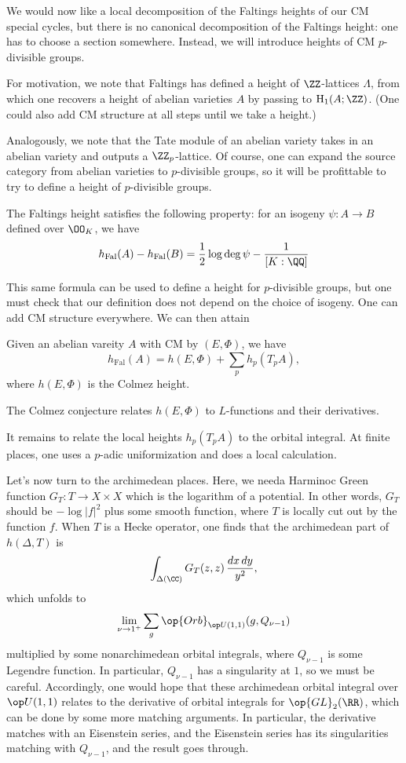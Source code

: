 \documentclass{article}
\begin{document}
We would now like a local decomposition of the Faltings heights of our CM special cycles, but there is no canonical decomposition of the Faltings height: one has to choose a section somewhere. Instead, we will introduce heights of CM $p$-divisible groups.
\begin{remark}
	For motivation, we note that Faltings has defined a height of $\ZZ$-lattices $\Lambda$, from which one recovers a height of abelian varieties $A$ by passing to $\mathrm H_1(A;\ZZ)$. (One could also add CM structure at all steps until we take a height.)
\end{remark}
Analogously, we note that the Tate module of an abelian variety takes in an abelian variety and outputs a $\ZZ_p$-lattice. Of course, one can expand the source category from abelian varieties to $p$-divisible groups, so it will be profittable to try to define a height of $p$-divisible groups.
\begin{remark}
	The Faltings height satisfies the following property: for an isogeny $\psi\colon A\to B$ defined over $\OO_K$, we have
	\[h_{\mathrm{Fal}}(A)-h_{\mathrm{Fal}}(B)=\frac12\log\deg\psi-\frac1{[K:\QQ]}\]
\end{remark}
This same formula can be used to define a height for $p$-divisible groups, but one must check that our definition does not depend on the choice of isogeny. One can add CM structure everywhere. We can then attain
\begin{proposition}
	Given an abelian vareity $A$ with CM by $(E,\Phi)$, we have
	\[h_{\mathrm{Fal}}(A)=h(E,\Phi)+\sum_ph_p(T_pA),\]
	where $h(E,\Phi)$ is the Colmez height.
\end{proposition}
\begin{remark}
	The Colmez conjecture relates $h(E,\Phi)$ to $L$-functions and their derivatives.
\end{remark}
It remains to relate the local heights $h_p(T_pA)$ to the orbital integral. At finite places, one uses a $p$-adic uniformization and does a local calculation.

Let's now turn to the archimedean places. Here, we needa Harminoc Green function $G_T\colon T\to X\times X$ which is the logarithm of a potential. In other words, $G_T$ should be $-\log\left|f\right|^2$ plus some smooth function, where $T$ is locally cut out by the function $f$. When $T$ is a Hecke operator, one finds that the archimedean part of $h(\Delta,T)$ is
\[\int_{\Delta(\CC)}G_T(z,z)\,\frac{dx\,dy}{y^2},\]
which unfolds to
\[\lim_{\nu\to1^+}\sum_g\op{Orb}_{\op U(1,1)}(g,Q_{\nu-1})\]
multiplied by some nonarchimedean orbital integrals, where $Q_{\nu-1}$ is some Legendre function. In particular, $Q_{\nu-1}$ has a singularity at $1$, so we must be careful. Accordingly, one would hope that these archimedean orbital integral over $\op U(1,1)$ relates to the derivative of orbital integrals for $\op{GL}_2(\RR)$, which can be done by some more matching arguments. In particular, the derivative matches with an Eisenstein series, and the Eisenstein series has its singularities matching with $Q_{\nu-1}$, and the result goes through.
\end{document}
